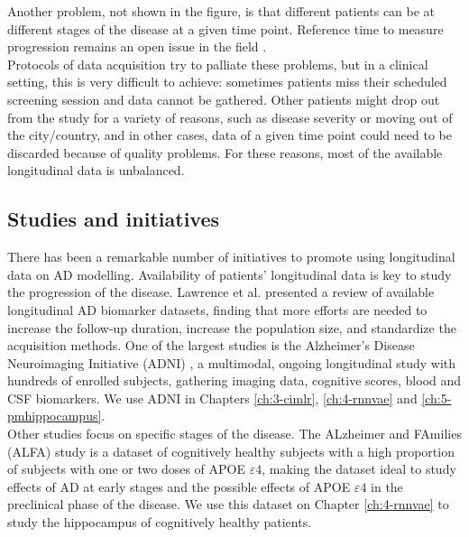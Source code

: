Another problem, not shown in the figure, is that different patients can be at different stages of the disease at a given time point. Reference time to measure progression remains an open issue in the field \cite{Ashford2001}.  \\

Protocols of data acquisition try to palliate these problems, but in a clinical setting, this is very difficult to achieve: sometimes patients miss their scheduled screening session and data cannot be gathered. Other patients might drop out from the study for a variety of reasons, such as disease severity or moving out of the city/country, and in other cases, data of a given time point could need to be discarded because of quality problems. For these reasons, most of the available longitudinal data is unbalanced. \\

\subsection{Studies and initiatives} 

There has been a remarkable number of initiatives to promote using longitudinal data on AD modelling. Availability of patients' longitudinal data is key to study the progression of the disease. Lawrence et al. \cite{Lawrence2017} presented a review of available longitudinal AD biomarker datasets, finding that more efforts are needed to increase the follow-up duration, increase the population size, and standardize the acquisition methods. One of the largest studies is the Alzheimer's Disease Neuroimaging Initiative (ADNI) \cite{Mueller2005}, a multimodal, ongoing longitudinal study with hundreds of enrolled subjects, gathering imaging data, cognitive scores, blood and CSF biomarkers. We use ADNI in Chapters \ref{ch:3-cimlr}, \ref{ch:4-rnnvae} and \ref{ch:5-pmhippocampus}. \\

Other studies focus on specific stages of the disease. The ALzheimer and FAmilies (ALFA) study \cite{Molinuevo2016} is a dataset of cognitively healthy subjects with a high proportion of subjects with one or two doses of APOE $\varepsilon4$, making the dataset ideal to study effects of AD at early stages and the possible effects of APOE $\varepsilon4$ in the preclinical phase of the disease. We use this dataset on Chapter \ref{ch:4-rnnvae} to study the hippocampus of cognitively healthy patients. \\

